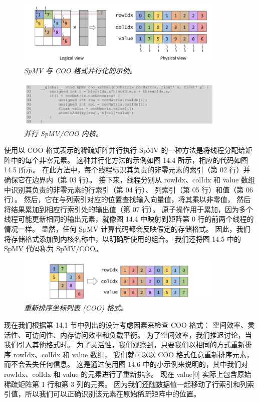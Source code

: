 \begin{figure}[H]
	\centering
	\includegraphics[width=0.9\textwidth]{figs/F14.4.png}
	\caption{\textit{SpMV 与 COO 格式并行化的示例。}}
\end{figure}

\begin{figure}[H]
	\centering
	\includegraphics[width=0.9\textwidth]{figs/F14.5.png}
	\caption{\textit{并行 SpMV/COO 内核。}}
\end{figure}

使用以 COO 格式表示的稀疏矩阵并行执行 SpMV 的一种方法是将线程分配给矩阵中的每个非零元素。 
这种并行化方法的示例如图 14.4 所示，相应的代码如图 14.5 所示。 
在此方法中，每个线程标识其负责的非零元素的索引（第 02 行）并确保它在边界内（第 03 行）。 
接下来，线程分别从 rowIdx、colIdx 和 value 数组中识别其负责的非零元素的行索引（第 04 行）、
列索引（第 05 行）和值（第 06 行）。 然后，它在与列索引对应的位置查找输入向量值，将其乘以非零值，
然后将结果累加到相应行索引处的输出值（第 07 行）。 
原子操作用于累加，因为多个线程可能更新相同的输出元素，就像图 14.4 中映射到矩阵第 0 行的前两个线程的情况一样。 
显然，任何 SpMV 计算代码都会反映假定的存储格式。 因此，我们将存储格式添加到内核名称中，以明确所使用的组合。 
我们还将图 14.5 中的 SpMV 代码称为 SpMV/COO。

\begin{figure}[H]
	\centering
	\includegraphics[width=0.9\textwidth]{figs/F14.6.png}
	\caption{\textit{重新排序坐标列表 (COO) 格式。}}
\end{figure}

现在我们根据第 14.1 节中列出的设计考虑因素来检查 $\mathrm{COO}$ 格式：
空间效率、灵活性、可访问性、内存访问效率和负载平衡。 为了空间效率，我们推迟讨论，当我们引入其他格式时。 
为了灵活性，我们观察到，只要我们以相同的方式重新排序 rowIdx、colIdx 和 value 数组，
我们就可以以 $\mathrm{COO}$ 格式任意重新排序元素，而不会丢失任何信息。 
这是通过使用图 14.6 中的小示例来说明的，其中我们对 rowIdx、colIdx 和 value 的元素进行了重新排序。 
现在 value[0] 实际上包含原始稀疏矩阵第 1 行和第 3 列的元素。 
因为我们还随数据值一起移动了行索引和列索引值，所以我们可以正确识别该元素在原始稀疏矩阵中的位置。

